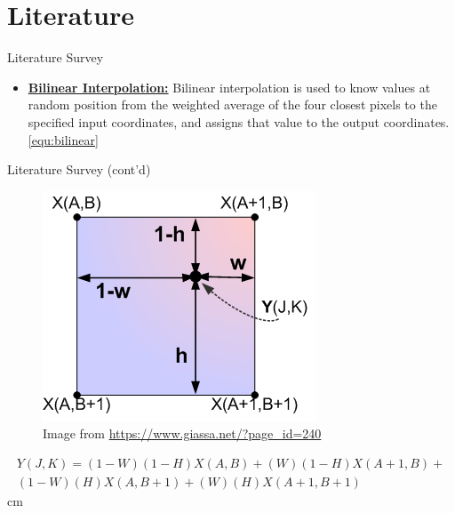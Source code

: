 \documentclass{beamer}
\begin{document}
\section{Literature}
	\begin{frame}{Literature Survey}
		\begin{itemize}
			\item \justifying \textbf{\underline{Bilinear Interpolation:}} Bilinear interpolation is used to know values at 	random position from the weighted average of the 	four closest pixels to the specified input coordinates, and assigns that value to the output coordinates.\cite{fadnavis2014image}  \eqref{equ:bilinear}
		\end{itemize}
	\end{frame}
	\begin{frame}{Literature Survey (cont'd)}
		\begin{figure}
			\includegraphics[scale=0.5]{./Figures/bilinear_interpolation.png}
			\caption{\label{fig:bilinear_img}Image from \url{https://www.giassa.net/?page_id=240}\cite{bilinear_img}}
		\end{figure}
		\begin{multline}\label{equ:bilinear}
			Y(J,K)=(1-W)(1-H)X(A,B)+(W)(1-H)X(A+1,B)+\\(1-W)(H)X(A,B+1)+(W)(H)X(A+1,B+1)
		\end{multline} cm
	\end{frame}
\end{document}

